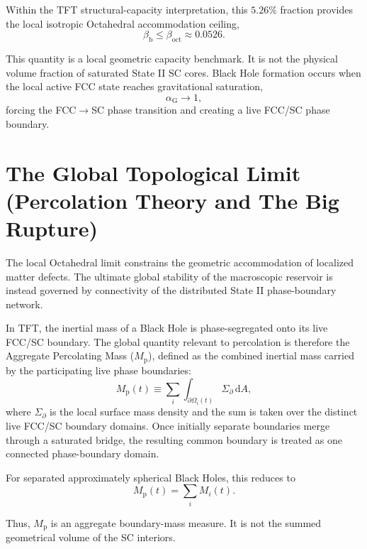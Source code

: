 Within the TFT structural-capacity interpretation, this $5.26\%$ fraction provides the local isotropic Octahedral accommodation ceiling,
\begin{equation}
    \beta_{\mathrm{b}}
    \leq
    \beta_{\mathrm{oct}}
    \approx
    0.0526.
\end{equation}

This quantity is a local geometric capacity benchmark. It is not the physical volume fraction of saturated State II SC cores. Black Hole formation occurs when the local active FCC state reaches gravitational saturation,
\begin{equation}
    \alpha_{\mathrm{G}}
    \rightarrow
    1,
\end{equation}
forcing the FCC$\rightarrow$SC phase transition and creating a live FCC/SC phase boundary.

\section{The Global Topological Limit (Percolation Theory and The Big Rupture)}

The local Octahedral limit constrains the geometric accommodation of localized matter defects. The ultimate global stability of the macroscopic reservoir is instead governed by connectivity of the distributed State II phase-boundary network.

In TFT, the inertial mass of a Black Hole is phase-segregated onto its live FCC/SC boundary. The global quantity relevant to percolation is therefore the Aggregate Percolating Mass ($M_{\mathrm{p}}$), defined as the combined inertial mass carried by the participating live phase boundaries:
\begin{equation}
    M_{\mathrm{p}}(t)
    \equiv
    \sum_i
    \int_{\partial\Omega_i(t)}
    \Sigma_{\partial}\,
    \mathrm{d}A,
\end{equation}
where $\Sigma_{\partial}$ is the local surface mass density and the sum is taken over the distinct live FCC/SC boundary domains. Once initially separate boundaries merge through a saturated bridge, the resulting common boundary is treated as one connected phase-boundary domain.

For separated approximately spherical Black Holes, this reduces to
\begin{equation}
    M_{\mathrm{p}}(t)
    =
    \sum_i M_i(t).
\end{equation}

Thus, $M_{\mathrm{p}}$ is an aggregate boundary-mass measure. It is not the summed geometrical volume of the SC interiors.

